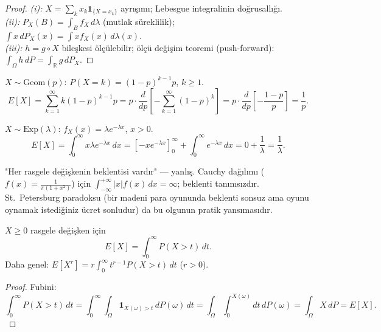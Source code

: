 \begin{proof}
\textit{(i):} $X = \sum_k x_k \mathbf{1}_{\{X = x_k\}}$ ayrışımı; Lebesgue integralinin doğrusallığı.\\
\textit{(ii):} $P_X(B) = \int_B f_X \, d\lambda$ (mutlak süreklilik);
$\int x \, dP_X(x) = \int x f_X(x) \, d\lambda(x)$.\\
\textit{(iii):} $h = g \circ X$ bileşkesi ölçülebilir; ölçü değişim teoremi (push-forward):
$\int_\Omega h \, dP = \int_{\mathbb{R}} g \, dP_X$.
\end{proof}

\begin{ornek}
$X \sim \mathrm{Geom}(p)$: $P(X = k) = (1-p)^{k-1} p$, $k \geq 1$.
\[
  E[X] = \sum_{k=1}^\infty k(1-p)^{k-1} p = p \cdot \frac{d}{dp}\!\left[-\sum_{k=1}^\infty (1-p)^k\right]
  = p \cdot \frac{d}{dp}\!\left[-\frac{1-p}{p}\right] = \frac{1}{p}.
\]
\end{ornek}

\begin{ornek}
$X \sim \mathrm{Exp}(\lambda)$: $f_X(x) = \lambda e^{-\lambda x}$, $x > 0$.
\[
  E[X] = \int_0^\infty x \lambda e^{-\lambda x} \, dx
  = \left[-x e^{-\lambda x}\right]_0^\infty + \int_0^\infty e^{-\lambda x} \, dx
  = 0 + \frac{1}{\lambda} = \frac{1}{\lambda}.
\]
\end{ornek}

\begin{hataanalizi}
"Her rasgele değişkenin beklentisi vardır" --- yanlış.
Cauchy dağılımı ($f(x) = \frac{1}{\pi(1+x^2)}$) için $\int_{-\infty}^{+\infty} |x| f(x) \, dx = \infty$;
beklenti tanımsızdır. St.\ Petersburg paradoksu (bir madeni para oyununda beklenti sonsuz
ama oyunu oynamak istediğiniz ücret sonludur) da bu olgunun pratik yansımasıdır.
\end{hataanalizi}

\begin{onerme}
\label{prop:kuyruk_beklenti}
$X \geq 0$ rasgele değişken için
\[
  E[X] = \int_0^\infty P(X > t) \, dt.
\]
Daha genel: $E[X^r] = r \int_0^\infty t^{r-1} P(X > t) \, dt$ ($r > 0$).
\end{onerme}

\begin{proof}
Fubini:
\[
  \int_0^\infty P(X > t) \, dt = \int_0^\infty \int_\Omega \mathbf{1}_{X(\omega) > t} \, dP(\omega) \, dt
  = \int_\Omega \int_0^{X(\omega)} dt \, dP(\omega) = \int_\Omega X \, dP = E[X].
\]
\end{proof}

